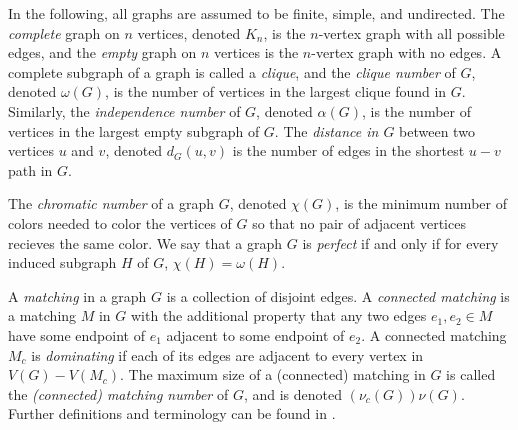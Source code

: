 
In the following, all graphs are assumed to be finite, simple, and undirected. The \textit{complete} graph on $n$ vertices, denoted $K_n$, is the $n$-vertex graph with all possible edges, and the \textit{empty} graph on $n$ vertices is the $n$-vertex graph with no edges.  A complete subgraph of a graph is called a \textit{clique}, and the \textit{clique number} of $G$, denoted $\omega(G)$, is the number of vertices in the largest clique found in $G$.  Similarly, the \textit{independence number} of $G$, denoted $\alpha(G)$, is the number of vertices in the largest empty subgraph of $G$.  The \textit{distance in $G$} between two vertices $u$ and $v$, denoted $d_G(u,v)$ is the number of edges in the shortest $u-v$ path in $G$. 

The \textit{chromatic number} of a graph $G$, denoted $\chi(G)$, is the minimum number of colors needed to color the vertices of $G$ so that no pair of adjacent vertices recieves the same color. We say that a graph $G$ is \textit{perfect} if and only if for every induced subgraph $H$ of $G$, $\chi(H) = \omega(H)$. 

A \textit{matching} in a graph $G$ is a collection of disjoint edges.  A \textit{connected matching} is a matching $M$ in $G$ with the additional property that any two edges $e_1, e_2 \in M$ have some endpoint of $e_1$ adjacent to some endpoint of $e_2$.  A connected matching $M_c$ is \textit{dominating} if each of its edges are adjacent to every vertex in $V(G)- V(M_c)$.  The maximum size of a (connected) matching in $G$ is called the \textit{(connected) matching number} of $G$, and is denoted $(\nu_c(G)) \nu(G)$. Further definitions and terminology can be found in \cite{dwest}.

